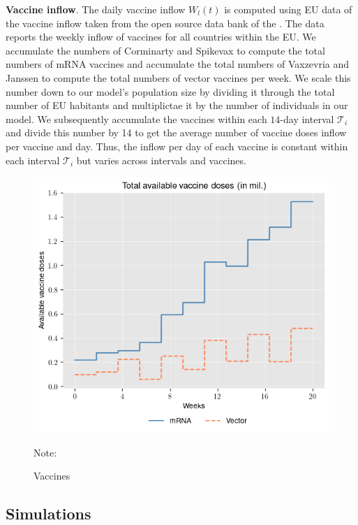 \textbf{Vaccine inflow}. The daily vaccine inflow $W_l(t)$ is computed using EU data of the vaccine inflow taken from the open source data bank of the \cite{ECDC.2021}. The data reports the weekly inflow of vaccines for all countries within the EU. We accumulate the numbers of Corminarty and Spikevax to compute the total numbers of mRNA vaccines and accumulate the total numbers of Vaxzevria and Janssen to compute the total numbers of vector vaccines per week. We scale this number down to our model's population size by dividing it through the total number of EU habitants and multiplictae it by the number of individuals in our model. We subsequently accumulate the vaccines within each $14$-day interval $\mathcal{T}_i$ and divide this number by 14 to get the average number of vaccine doses inflow per vaccine and day. Thus, the inflow per day of each vaccine is constant within each interval $\mathcal{T}_i$ but varies across intervals and vaccines.
\begin{figure}[h!]
\centering
\includegraphics[scale=0.7]{images/available_vaccine.png}\\
\begin{flushleft}
\scriptsize{Note:}
\end{flushleft}
\caption{Vaccines}
\label{fig:available_vaccine}
\end{figure}

\subsection{Simulations}



